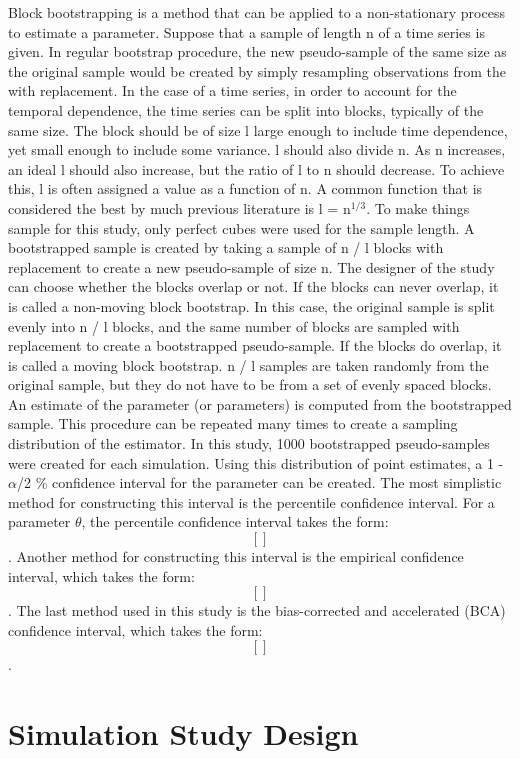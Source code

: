 \documentclass[12pt, letterpaper, titlepage]{article}
\begin{document}
Block bootstrapping is a method that can be applied to a non-stationary process to estimate a parameter. Suppose that a sample of length n of a time series is given. In regular bootstrap procedure, the new pseudo-sample of the same size as the original sample would be created by simply resampling observations from the with replacement. In the case of a time series, in order to account for the temporal dependence, the time series can be split into blocks, typically of the same size. The block should be of size l large enough to include time dependence, yet small enough to include some variance. l should also divide n. As n increases, an ideal l should also increase, but the ratio of l to n should decrease. To achieve this, l is often assigned a value as a function of n. A common function that is considered the best by much previous literature is l = n$^{1/3}$. To make things sample for this study, only perfect cubes were used for the sample length. A bootstrapped sample is created by taking a sample of n / l blocks with replacement to create a new pseudo-sample of size n. The designer of the study can choose whether the blocks overlap or not. If the blocks can never overlap, it is called a non-moving block bootstrap. In this case, the original sample is split evenly into n / l blocks, and the same number of blocks are sampled with replacement to create a bootstrapped pseudo-sample. If the blocks do overlap, it is called a moving block bootstrap. n / l samples are taken randomly from the original sample, but they do not have to be from a set of evenly spaced blocks. An estimate of the parameter (or parameters) is computed from the bootstrapped sample. This procedure can be repeated many times to create a sampling distribution of the estimator. In this study, 1000 bootstrapped pseudo-samples were created for each simulation. Using this distribution of point estimates, a 1 - $\alpha$/2 \% confidence interval for the parameter can be created. The most simplistic method for constructing this interval is the percentile confidence interval. For a parameter $\theta$, the percentile confidence interval takes the form: \[ [ ]\]. Another method for constructing this interval is the empirical confidence interval, which takes the form: \[ [ ]\]. The last method used in this study is the bias-corrected and accelerated 
(BCA) confidence interval, which takes the form: \[ [ ]\].

\section{Simulation Study Design}
\label{sec:simdesign}
\end{document}
